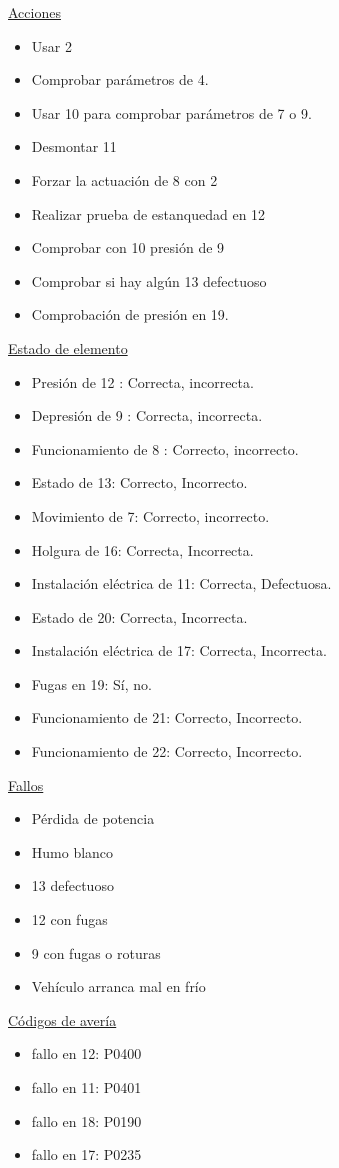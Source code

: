 \documentclass[a4paper,12pt]{article}
\begin{document}
\underline{Acciones}
\begin{itemize}
\item Usar 2
\item Comprobar parámetros de 4.
\item Usar 10 para comprobar parámetros de 7 o 9.
\item Desmontar 11
\item Forzar la actuación de 8 con 2
\item Realizar prueba de estanquedad en 12
\item Comprobar con 10 presión de 9
\item Comprobar si hay algún 13 defectuoso
\item Comprobación de presión en 19.
\end{itemize}

\underline{Estado de elemento}
\begin{itemize}
\item Presión de 12 : Correcta, incorrecta.
\item Depresión de 9 : Correcta, incorrecta.
\item Funcionamiento de 8 : Correcto, incorrecto.
\item Estado de 13: Correcto, Incorrecto.
\item Movimiento de 7: Correcto, incorrecto.
\item Holgura de 16: Correcta, Incorrecta.
\item Instalación eléctrica de 11: Correcta, Defectuosa.
\item Estado de 20: Correcta, Incorrecta.
\item Instalación eléctrica de 17: Correcta, Incorrecta.
\item Fugas en 19: Sí, no.
\item Funcionamiento de 21: Correcto, Incorrecto.
\item Funcionamiento de 22: Correcto, Incorrecto.
\end{itemize}

\underline{Fallos}
\begin{itemize}
\item Pérdida de potencia
\item Humo blanco
\item 13 defectuoso
\item 12 con fugas
\item 9 con fugas o roturas
\item Vehículo arranca mal en frío
\end{itemize}


\underline{Códigos de avería}
\begin{itemize}
\item fallo en 12: P0400
\item fallo en 11: P0401
\item fallo en 18: P0190
\item fallo en 17: P0235
\end{itemize}
\end{document}
